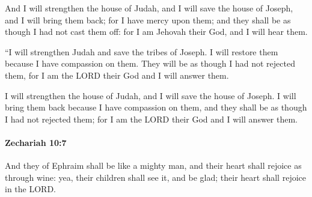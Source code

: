 			\begin{versebox}
					\item[BHS] 
					\item[LXX] 
					\item[ASV] And I will strengthen the house of Judah, and I will save the house of Joseph, and I will bring them back; for I have mercy upon them; and they shall be as though I had not cast them off: for I am Jehovah their God, and I will hear them.
					\item[NIV] “I will strengthen Judah and save the tribes of Joseph. I will restore them because I have compassion on them. They will be as though I had not rejected them, for I am the LORD their God and I will answer them.
					\item[NRSV] I will strengthen the house of Judah, and I will save the house of Joseph. I will bring them back because I have compassion on them, and they shall be as though I had not rejected them; for I am the LORD their God and I will answer them.
			\end{versebox}

		\paragraph{Zechariah 10:7} %
			\label{ZECHARIAH-10-7}

			And they of Ephraim shall be like a mighty man, and their heart shall rejoice as through wine: yea, their children shall see it, and be glad; their heart shall rejoice in the LORD.

